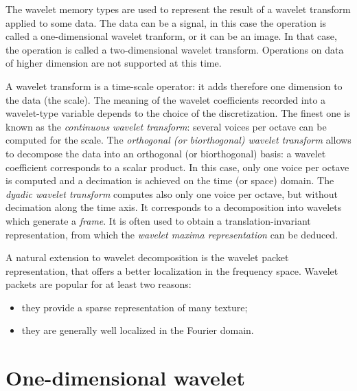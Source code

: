 %
%

The wavelet memory types are used to represent the result of a wavelet 
transform applied to some data. 
The data can be a signal, in this case the operation is called a one-dimensional wavelet tranform, or it can be an image. 
In that case, the operation is called a two-dimensional wavelet transform.
Operations on data of higher dimension are not supported at this time.

A wavelet transform is a time-scale operator: it adds therefore one dimension 
to the data (the scale).
The meaning of the wavelet coefficients recorded into a wavelet-type variable depends to the choice of the discretization.
The finest one is known as the {\em continuous wavelet transform}: several
voices per octave can be computed for the scale. 
The {\em orthogonal (or biorthogonal) wavelet transform}
 allows to decompose
the data into an orthogonal (or biorthogonal) basis: a wavelet coefficient
corresponds to a scalar product. In this case, only one voice per octave
is computed and a decimation is achieved on the time (or space) domain.
The {\em dyadic wavelet transform} computes also only one voice per octave, but
without decimation along the time axis. It corresponds to a decomposition into wavelets
which generate a {\em frame}. It is often used to obtain a translation-invariant representation, 
from which the {\em wavelet maxima representation} can be deduced.

A natural extension to wavelet decomposition is the wavelet packet representation,
that offers a better localization in the frequency space.
Wavelet packets are popular for at least two reasons: 
\begin{itemize} 
\item they provide a sparse representation of many texture;
\item they are generally well localized in the Fourier domain. 
\end{itemize}

\section{One-dimensional wavelet}


